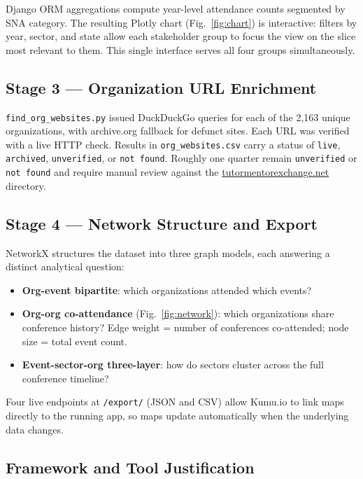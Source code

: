 \documentclass[10pt,twocolumn,letterpaper]{article}
\begin{document}
Django ORM aggregations compute year-level attendance counts
segmented by SNA category. The resulting Plotly chart
(Fig.~\ref{fig:chart}) is interactive: filters by year, sector, and
state allow each stakeholder group to focus the view on the slice
most relevant to them. This single interface serves all four groups
simultaneously.

\subsection{Stage 3 — Organization URL Enrichment}

\texttt{find\_org\_websites.py} issued DuckDuckGo queries for each
of the 2,163 unique organizations, with archive.org fallback for
defunct sites. Each URL was verified with a live HTTP check.
Results in \texttt{org\_websites.csv} carry a status of
\texttt{live}, \texttt{archived}, \texttt{unverified}, or
\texttt{not found}. Roughly one quarter remain \texttt{unverified}
or \texttt{not found} and require manual review against the
\href{https://tutormentorexchange.net}{tutormentorexchange.net}
directory.

\subsection{Stage 4 — Network Structure and Export}

NetworkX structures the dataset into three graph models, each
answering a distinct analytical question:
\begin{itemize}
  \item \textbf{Org-event bipartite}: which organizations attended which events?
  \item \textbf{Org-org co-attendance} (Fig.~\ref{fig:network}): which
        organizations share conference history? Edge weight = number of
        conferences co-attended; node size = total event count.
  \item \textbf{Event-sector-org three-layer}: how do sectors cluster across the
        full conference timeline?
\end{itemize}

Four live endpoints at \texttt{/export/} (JSON and CSV) allow Kumu.io
to link maps directly to the running app, so maps update automatically
when the underlying data changes.

\subsection{Framework and Tool Justification}
\end{document}
